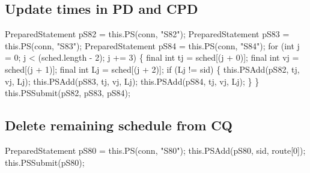 \subsection{Update times in PD and CPD}
\nwenddocs{}\endmoddef{}
PreparedStatement pS82 = this.PS(conn, "S82");
PreparedStatement pS83 = this.PS(conn, "S83");
PreparedStatement pS84 = this.PS(conn, "S84");
for (int j = 0; j < (sched.length - 2); j += 3) \{
  final int tj = sched[(j + 0)];
  final int vj = sched[(j + 1)];
  final int Lj = sched[(j + 2)];
  if (Lj != sid) \{
    this.PSAdd(pS82, tj, vj, Lj);
    this.PSAdd(pS83, tj, vj, Lj);
    this.PSAdd(pS84, tj, vj, Lj);
  \}
\}
this.PSSubmit(pS82, pS83, pS84);
\nwendcode{}\nwdocspar

\subsection{Delete remaining schedule from CQ}
\nwenddocs{}\endmoddef{}
PreparedStatement pS80 = this.PS(conn, "S80");
this.PSAdd(pS80, sid, route[0]);
this.PSSubmit(pS80);
\nwendcode{}\nwdocspar


